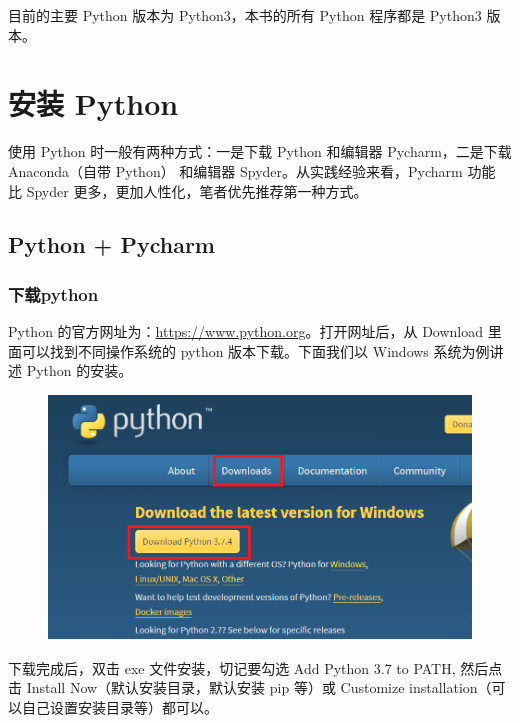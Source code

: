目前的主要 Python 版本为 Python3，本书的所有 Python 程序都是 Python3 版本。

\clearpage
\section{安装 Python}

使用 Python 时一般有两种方式：一是下载 Python 和编辑器 Pycharm，二是下载 Anaconda（自带 Python） 和编辑器 Spyder。从实践经验来看，Pycharm 功能 比 Spyder 更多，更加人性化，笔者优先推荐第一种方式。

\subsection{Python + Pycharm}
\subsubsection{下载python}


Python 的官方网址为：\href{https://www.python.org}{https://www.python.org}。打开网址后，从 Download 里面可以找到不同操作系统的 python 版本下载。下面我们以 Windows 系统为例讲述 Python 的安装。

\begin{figure}[!ht]
  \centering
  \includegraphics[scale=0.6]{figure/chapter1/pythonDownload.png}
\end{figure}

下载完成后，双击 exe 文件安装，切记要勾选 Add Python 3.7 to PATH, 然后点击 Install Now（默认安装目录，默认安装 pip 等）或 Customize installation（可以自己设置安装目录等）都可以。

